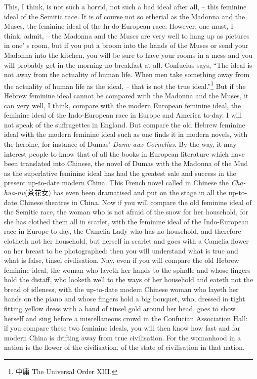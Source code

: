 This, I think, is not such a horrid, not such a bad ideal after all,
-- this feminine ideal of the Semitic race.
It is of course not so etherial as the Madonna and the Muses,
the feminine ideal of the In-do-European race. However, one must, I think, admit,
-- the Madonna and the Muses are very well to hang up as pictures in one' s room,
but if you put a broom into the hands of the Muses or send your Madonna into the kitchen,
you will be sure to have your rooms in a mess and you will probably get in the morning no breakfast at all.
Confucius says, ``The ideal is not away from the actuality of human life.
When men take something away from the actuality of human life as the ideal,
-- that is not the true ideal.''\footnote{中庸 The Universal Order XIII.}
But if the Hebrew feminine ideal cannot be compared with the Madonna and the Muses,
it can very well, I think, compare with the modern European feminine ideal,
the feminine ideal of the Indo-European race in Europe and America to-day.
I will not speak of the suffragettes in England.
But compare the old Hebrew feminine ideal with the modern feminine ideal such as one finds it in modern novels,
with the heroine, for instance of Dumas' \emph{Dame aux Cornelias}.
By the way, it may interest people to know that of all the books in European literature which have been translated into Chinese,
the novel of Dumas with the Madonna of the Mud as the superlative feminine ideal has had the greatest sale and success in the present up-to-date modern China.
This French novel called in Chinese the \emph{Cha-hua-nu}(茶花女) has even been dramatised and put on the stage in all the up-to-date Chinese theatres in China.
Now if you will compare the old feminine ideal of the Semitic race,
the woman who is not afraid of the
snow for her household, for she has clothed them all in scarlet,
with the feminine ideal of the Indo-European race in Europe to-day,
the Camelia Lady who has no household, and therefore clotheth not her household,
but herself in scarlet and goes with a Camelia flower on her breast to be photographed: then you will understand what is true and what is false, tinsel civilisation.
Nay, even if you will compare the old Hebrew feminine ideal,
the woman who layeth her hands to the spindle and whose fingers hold the distaff, who looketh well to the ways of her household and eateth not the bread of idleness,
with the up-to-date modem Chinese woman who layeth her hands on the piano and whose fingers hold a big bouquet,
who, dressed in tight fitting yellow dress with a band of tinsel gold around her head,
goes to show herself and sing before a miscellaneous crowd in the Confucian Association Hall:
if you compare these two feminine ideals,
you will then know how fast and far modern China is drifting away from true civilisation.
For the womanhood in a nation is the flower of the civilisation,
of the state of civilisation in that nation.


